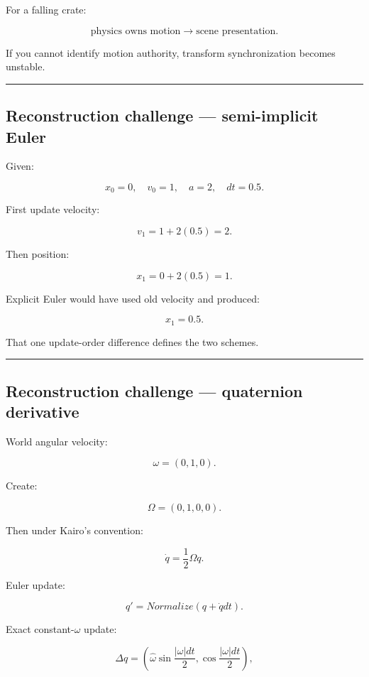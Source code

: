 For a falling crate:

\[
\text{physics owns motion}
\rightarrow
\text{scene presentation}.
\]

If you cannot identify motion authority, transform synchronization becomes unstable.

\begin{center}\rule{0.5\linewidth}{0.5pt}\end{center}

\subsection{Reconstruction challenge --- semi-implicit Euler}\label{06-engine-ii-ch038-reconstruction-challenge-semi-implicit-euler}

Given:

\[
x_0=0,
\quad
v_0=1,
\quad
a=2,
\quad
dt=0.5.
\]

First update velocity:

\[
v_1
=
1+2(0.5)
=
2.
\]

Then position:

\[
x_1
=
0+2(0.5)
=
1.
\]

Explicit Euler would have used old velocity and produced:

\[
x_1=0.5.
\]

That one update-order difference defines the two schemes.

\begin{center}\rule{0.5\linewidth}{0.5pt}\end{center}

\subsection{Reconstruction challenge --- quaternion derivative}\label{06-engine-ii-ch038-reconstruction-challenge-quaternion-derivative}

World angular velocity:

\[
\omega=(0,1,0).
\]

Create:

\[
\Omega=(0,1,0,0).
\]

Then under Kairo's convention:

\[
\boxed{
\dot q
=
\frac12\Omega q.
}
\]

Euler update:

\[
q'
=
Normalize(
q+\dot qdt
).
\]

Exact constant-\(\omega\) update:

\[
\Delta q
=
\left(
\hat\omega
\sin\frac{|\omega|dt}{2},
\cos\frac{|\omega|dt}{2}
\right),
\]

